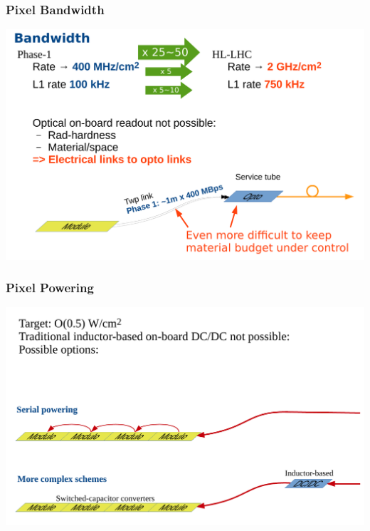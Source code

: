 \documentclass[pdftex, 11pt]{beamer}
\begin{document}
\begin{frame}
  \frametitle{Pixel Bandwidth}
  \begin{center}
    \includegraphics[width=\textwidth]{img/optoele.pdf}
  \end{center}
\end{frame}

\begin{frame}
  \frametitle{Pixel Powering}
  \begin{center}
    \includegraphics[width=\textwidth]{img/pixelPower.pdf}
  \end{center}
\end{frame}
\end{document}
